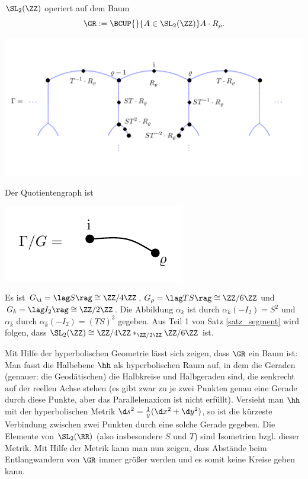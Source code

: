 \begin{enumerate}
$\SL_2(\ZZ)$ operiert auf dem Baum
\[
\GR := \BCUP{}{A\in\SL_2(\ZZ)} A\cdot R_{\rho}.
\]
\begin{center}
	\includegraphics{grugraImages/Hbaum}
\end{center}
Der Quotientengraph ist
\begin{center}
	\includegraphics{grugraImages/rhoquot}
\end{center}
Es ist $G_{\i}=\lag S\rag \cong \ZZ/4\ZZ$,
$G_{\rho}=\lag TS\rag\cong \ZZ/6\ZZ$ und
$G_k=\lag I_2\rag \cong\ZZ/2\ZZ$.
Die Abbildung $\alpha_k$ ist durch $\alpha_k(-I_2)=S^2$ und
$\alpha_{\bar{k}}$ durch
$\alpha_{\bar{k}}(-I_2)=(TS)^3$ gegeben.
Aus Teil 1 von Satz \ref{satz_segment} wird folgen,
dass $\SL_2(\ZZ)\cong \ZZ/4\ZZ*_{\ZZ/2\ZZ} \ZZ/6\ZZ$ ist.

Mit Hilfe der hyperbolischen Geometrie lässt sich zeigen, dass
$\GR$ ein Baum ist:\\
Man fasst die Halbebene $\hh$ als hyperbolischen Raum auf, in dem
die Geraden (genauer: die Geodätischen) die Halbkreise und Halbgeraden
sind, die senkrecht auf der reellen Achse stehen (es gibt zwar
zu je zwei Punkten genau eine Gerade durch diese Punkte, aber
das Parallelenaxiom ist nicht erfüllt).
Versieht man $\hh$ mit der hyperbolischen Metrik
$\d s^2 = \frac{1}{y}(\d x^2 + \d y^2)$, so ist die kürzeste
Verbindung zwischen zwei Punkten durch eine solche Gerade gegeben.
Die Elemente von $\SL_2(\RR)$ (also insbesondere $S$ und $T$) sind
Isometrien bzgl. dieser Metrik. Mit Hilfe der Metrik kann man nun
zeigen, dass Abstände beim Entlangwandern von $\GR$ immer größer
werden und es somit keine Kreise geben kann.
\end{enumerate}

